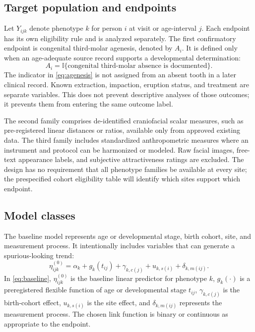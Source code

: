 \documentclass[conference]{IEEEtran}
\newcommand{\indicator}{\mathbb{I}}
\begin{document}
\subsection{Target population and endpoints}

Let $Y_{ijk}$ denote phenotype $k$ for person $i$ at visit or age-interval
$j$. Each endpoint has its own eligibility rule and is analyzed separately.
The first confirmatory endpoint is congenital third-molar agenesis, denoted
by $A_i$. It is defined only when an age-adequate source record supports a
developmental determination:
\begin{equation}
A_i=\indicator\{\text{congenital third-molar absence is documented}\}.
\label{eq:agenesis}
\end{equation}
The indicator in \eqref{eq:agenesis} is not assigned from an absent tooth in
a later clinical record. Known extraction, impaction, eruption status, and
treatment are separate variables. This does not prevent descriptive analyses
of those outcomes; it prevents them from entering the same outcome label.

The second family comprises de-identified craniofacial scalar measures, such
as pre-registered linear distances or ratios, available only from approved
existing data. The third family includes standardized anthropometric measures
where an instrument and protocol can be harmonized or modeled. Raw facial
images, free-text appearance labels, and subjective attractiveness ratings are
excluded. The design has no requirement that all phenotype families be
available at every site; the prespecified cohort eligibility table will
identify which sites support which endpoint.

\subsection{Model classes}

The baseline model represents age or developmental stage, birth cohort, site,
and measurement process. It intentionally includes variables that can generate
a spurious-looking trend:
\begin{equation}
\eta^{(0)}_{ijk}=\alpha_k+g_k(t_{ij})+\gamma_{k,c(j)}
+u_{k,s(i)}+\delta_{k,m(ij)}.
\label{eq:baseline}
\end{equation}
In \eqref{eq:baseline}, $\eta^{(0)}_{ijk}$ is the baseline linear predictor
for phenotype $k$, $g_k(\cdot)$ is a preregistered flexible function of age
or developmental stage $t_{ij}$, $\gamma_{k,c(j)}$ is the birth-cohort
effect, $u_{k,s(i)}$ is the site effect, and $\delta_{k,m(ij)}$ represents
the measurement process. The chosen link function is binary or continuous as
appropriate to the endpoint.
\end{document}
